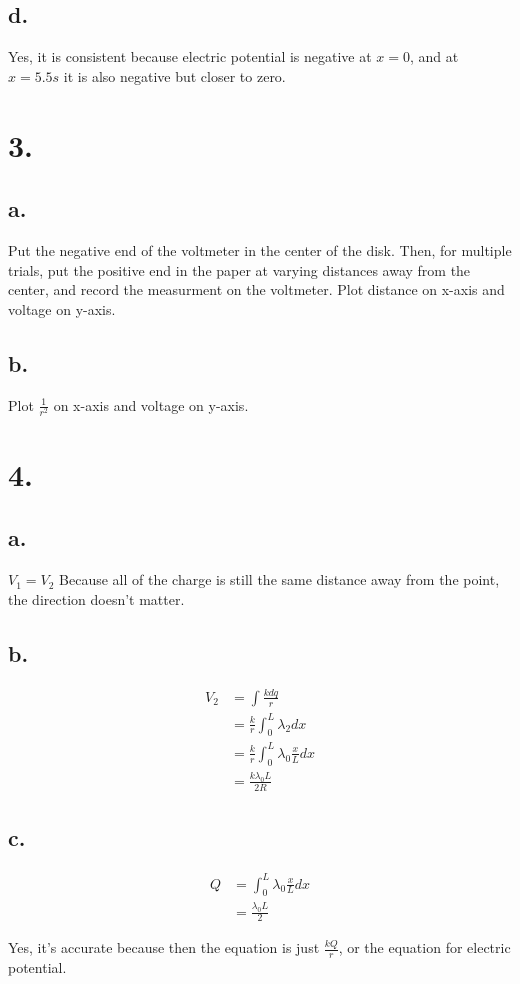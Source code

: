 \documentclass{article}
\begin{document}
\subsection*{d.} Yes, it is consistent because electric potential is negative at $x=0$, and at $x=5.5s$ it is also negative but closer to zero. 

\section*{3.}
\subsection*{a.} Put the negative end of the voltmeter in the center of the disk. Then, for multiple trials, put the positive end in the paper at varying distances away from the center, and record the measurment on the voltmeter. Plot distance on x-axis and voltage on y-axis.

\subsection*{b.} Plot $\frac{1}{r^2}$ on x-axis and voltage on y-axis.

\section*{4.}
\subsection*{a.}
$V_1=V_2$ Because all of the charge is still the same distance away from the point, the direction doesn't matter.

\subsection*{b.}
\begin{align*}
    V_2 &= \int \frac{kdq}{r} \\
    &= \frac{k}{r} \int_0^L \lambda_2dx \\
    &= \frac{k}{r} \int_0^L \lambda_0\frac{x}{L}dx \\
    &= \frac{k\lambda_0L}{2R}
\end{align*}

\subsection*{c.}
\begin{align*}
    Q &= \int_0^L \lambda_0 \frac{x}{L} dx \\
    &= \frac{\lambda_0 L}{2}
\end{align*}

Yes, it's accurate because then the equation is just $\frac{kQ}{r}$, or the equation for electric potential. 
\end{document}

